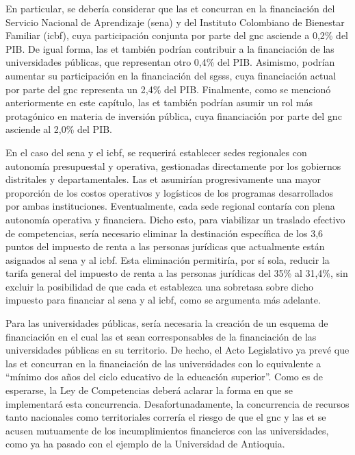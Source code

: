 En particular, se debería considerar que las \gls{et} concurran en la financiación del Servicio Nacional de Aprendizaje (\gls{sena}) y del Instituto Colombiano de Bienestar Familiar (\gls{icbf}), cuya participación conjunta por parte del \gls{gnc}  asciende a 0,2\% del PIB. De igual forma, las \gls{et} también podrían contribuir a la financiación de las universidades públicas, que representan otro 0,4\% del PIB. Asimismo, podrían aumentar su participación en la financiación del \gls{sgsss}, cuya financiación actual por parte del \gls{gnc} representa un 2,4\% del PIB. Finalmente, como se mencionó anteriormente en este capítulo, las \gls{et} también podrían asumir un rol más protagónico en materia de inversión pública, cuya financiación por parte del \gls{gnc} asciende al 2,0\% del PIB.

En el caso del \gls{sena} y el \gls{icbf}, se requerirá establecer sedes regionales con autonomía presupuestal y operativa, gestionadas directamente por los gobiernos distritales y departamentales. Las \gls{et} asumirían progresivamente una mayor proporción de los costos operativos y logísticos de los programas desarrollados por ambas instituciones. Eventualmente, cada sede regional contaría con plena autonomía operativa y financiera. Dicho esto, para viabilizar un traslado efectivo de competencias, sería necesario eliminar la destinación específica de los 3,6 puntos del impuesto de renta a las personas jurídicas que actualmente están asignados al \gls{sena} y al \gls{icbf}. Esta eliminación permitiría, por sí sola, reducir la tarifa general del impuesto de renta a las personas jurídicas del 35\% al 31,4\%, sin excluir la posibilidad de que cada \gls{et} establezca una sobretasa sobre dicho impuesto para financiar al \gls{sena} y al \gls{icbf}, como se argumenta más adelante. %

Para las universidades públicas, sería necesaria la creación de un esquema de financiación en el cual las \gls{et} sean corresponsables de la financiación de las universidades públicas en su territorio. De hecho, el Acto Legislativo ya prevé que las \gls{et} concurran en la financiación de las universidades con lo equivalente a ``mínimo dos años del ciclo educativo de la educación superior''. Como es de esperarse, la Ley de Competencias deberá aclarar la forma en que se implementará esta concurrencia. Desafortunadamente, la concurrencia de recursos tanto nacionales como territoriales correría el riesgo de que el \gls{gnc} y las \gls{et} se acusen mutuamente de los incumplimientos financieros con las universidades, como ya ha pasado con el ejemplo de la Universidad de Antioquia.


